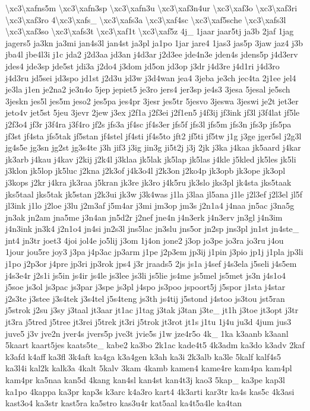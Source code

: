 {\textbackslash{}xc3\textbackslash{}xafns5m \textbackslash{}xc3\textbackslash{}xafn3sp \textbackslash{}xc3\textbackslash{}xafn3u \textbackslash{}xc3\textbackslash{}xaf3n4ur \textbackslash{}xc3\textbackslash{}xaf3o \textbackslash{}xc3\textbackslash{}xaf3ri \textbackslash{}xc3\textbackslash{}xaf3ro 4\textbackslash{}xc3\textbackslash{}xafs\-\_\- \textbackslash{}xc3\textbackslash{}xafs3a \textbackslash{}xc3\textbackslash{}xaf4sc \textbackslash{}xc3\textbackslash{}xaf5sche \textbackslash{}xc3\textbackslash{}xafs3l \textbackslash{}xc3\textbackslash{}xaf3so \textbackslash{}xc3\textbackslash{}xafs3t \textbackslash{}xc3\textbackslash{}xaf1t \textbackslash{}xc3\textbackslash{}xaf5z 4j\-\_\- 1jaar jaar5tj ja3b 2jaf 1jag jagers5 ja3kn ja3mi jan4s3l jan4st ja3pl ja1po 1jar jare4 1jas3 jas5p 3jaw jaz4 j3b jba4l jbe4l3i j1c jda2 j2d3aa jd3an j4d3ar j2d3ee jde4n3e jden4s jdens5p j4d3erv jdes4 jde3sp jde5st jdi3a j2do4 j3dom jd5on jd3op j3dr j4d3re j4d1ri j4d3ro j4d3ru jd5sei jd3spo jd1st j2d3u jd3w j3d4wan jea4 3jeba je3ch jec4ta 2j1ee jel4 je3la j1en je2na2 je3n4o 5jep jepiet5 je3ro jers4 jer3sp je4s3 3jesa 5jesal je5sch 3jeskn jes5l jes5m jeso2 jes5pa jes4pr 3jesr jes5tr 5jesvo 3jeswa 3jeswi je2t jet3er jeto4v jet5st 5jeu 3jevr 2jew j3ex j2f1a j2f3ei j2f1en5 j4f3ij jf3ink jf3l j3f4lat jf5le j2f3o4 jf3r j3f4ra j3f4ro jf2s jfs3a jf4sc jf4s3er jfs5f jfs3l jfs5m jfs3n jfs3p jfs5pa jf3st jf4sta jfs5tak jf5stan jf4stel jf4sti jf4s5to jft2 jf5ti jf5tw j1g j3ge jger5sl j2g3l jg4s5e jg3sn jg2st jg3s4te j3h jif3 j3ig jin3g ji5t2j j3j 2jk j3ka j4kaa jk5aard j4kar jk3arb j4kau j4kav j2kij j2k4l j3klaa jk5lak jk5lap jk5las j4kle j5kled jk5les jk5li j3klon jk5lop jk5luc j2kna j2k3of j4k3o4l j2k3on j2ko4p jk3opb jk3ope jk3opl j3kops j2kr j4kra jk3raa j5kran jk3re jk3ro j4k5ru jk3slo jks3pl jk4sta jks5taak jks5taal jks5tak jk5stan j2k3ui jk3w j3k4was j1la j3laa jl5ana j1le j2l3ef j2l3el jl5f jl3ink j1lo j2loe j3lu j2m3af j5m4ar j3mi jm3op jm3s j2n1a4 j4naa jn5ac j3na5g jn3ak jn2am jna5me j3n4an jn5d2r j2nef jne4n j4n3erk j4n3erv jn3gl j4n3im j4n3ink jn3k4 j2n1o4 jn4si jn2s3l jns5lac jn3slu jns5or jn2sp jns3pl jn1st jn4ste\-\_\- jnt4 jn3tr joet3 4joi jol4e jo5lij j3om 1j4on jone2 j3op jo3pe jo3ra jo3ru j4ou 1jour jou5re joy3 j3pa j4p3ac jp3arm j1pe j2p3em jp3ij j1pin j3pio jp1j j1pla jp3li j1po j2p3or j4pre jp3ri jp3rok jps4 j3r jraads5 2js js1a j4sef j4s3ela j5seli j4s5em j4s3e4r j2s1i js5in js4ir js4le js3lee js3li js5lie js4me js5mel js5met js3n j4s1o4 j5soe js3ol js3pac js3par j3spe js3pl j4spo js3poo jspoort5j j5spor j1sta j4star j2s3te j3stee j3s4tek j3s4tel j5s4teng js3th js4tij j5stond j4stoo js3tou jst5ran j5strok j2su j3sy j3taal jt3aar jt1ac j1tag j3tak j3tan j3te\-\_\- jt1h j3toe jt3opt j3tr jt3ra j5tred j5tree jt3rei j5trek jt3ri j5trok jt3rot jt1s j1tu 1j4u ju3d 4jum jus3 juve5 j3v jve2n jver4s jvers5p jve3t jvie5s j1w jze4r5o 4k\-\_\- 1ka k3aanb k3aanl 5kaart kaart5jes kaats5te\-\_\- kabe2 ka3bo 2k1ac kade4t5 4k3adm ka3do k3adv 2kaf k3afd k4aff ka3fl 3k4aft ka4ga k3a4gen k3ah ka3i 2k3alb ka3le 5kalf kalf4s5 ka3l4i kal2k kalk3a 4kalt 5kalv 3kam 4kamb kamen4 kame4re kam4pa kam4pl kam4pr ka5naa kan5d 4kang kan4sl kan4st kan4t3j kao3 5kap\-\_\- ka3pe kap3l ka1po 4kappa ka3pr kap3s k3arc k4a3ro kart4 4k3arti kar3tr ka4s kas5c 4k3asi kast3o4 ka3str kast5ra ka5stro kas3u4r kat5aal ka4t5a4le ka4tan }
